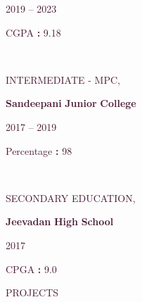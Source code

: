 \documentclass[12pt]{article}
\begin{document}
\begin{justify}
\textcolor[HTML]{481A34}{2019} \textcolor[HTML]{481A34}{ } \textcolor[HTML]{481A34}{–} \textcolor[HTML]{481A34}{ } \textcolor[HTML]{481A34}{2023}
\end{justify}
\begin{justify}
\textcolor[HTML]{481A34}{CGPA} \textcolor[HTML]{481A34}{ } \textcolor[HTML]{481A34}{\textbf{:}} \textcolor[HTML]{481A34}{\textbf{ }} \textcolor[HTML]{481A34}{9.18}
\end{justify}
\\
\begin{justify}
\textcolor[HTML]{481A34}{INTERMEDIATE - MPC,}
\end{justify}
\begin{flushleft}
\textcolor[HTML]{481A34}{\textbf{Sandeepani}} \textcolor[HTML]{481A34}{\textbf{ }} \textcolor[HTML]{481A34}{\textbf{Junior}} \textcolor[HTML]{481A34}{\textbf{ }} \textcolor[HTML]{481A34}{\textbf{College}}
\end{flushleft}
\begin{justify}
\textcolor[HTML]{481A34}{2017} \textcolor[HTML]{481A34}{ } \textcolor[HTML]{481A34}{–} \textcolor[HTML]{481A34}{ } \textcolor[HTML]{481A34}{2019}
\end{justify}
\begin{justify}
\textcolor[HTML]{481A34}{Percentage} \textcolor[HTML]{481A34}{ } \textcolor[HTML]{481A34}{\textbf{: }} \textcolor[HTML]{481A34}{98}
\end{justify}
\\
\begin{justify}
\textcolor[HTML]{481A34}{SECONDARY} \textcolor[HTML]{481A34}{ } \textcolor[HTML]{481A34}{EDUCATION,}
\end{justify}
\begin{flushleft}
\textcolor[HTML]{481A34}{\textbf{Jeevadan}} \textcolor[HTML]{481A34}{\textbf{ }} \textcolor[HTML]{481A34}{\textbf{High}} \textcolor[HTML]{481A34}{\textbf{ }} \textcolor[HTML]{481A34}{\textbf{School}}
\end{flushleft}
\begin{justify}
\textcolor[HTML]{481A34}{2017}
\end{justify}
\begin{justify}
\textcolor[HTML]{481A34}{CPGA} \textcolor[HTML]{481A34}{ } \textcolor[HTML]{481A34}{\textbf{:}} \textcolor[HTML]{481A34}{\textbf{ }} \textcolor[HTML]{481A34}{9.0}
\end{justify}
\begin{justify}

 \textcolor[HTML]{481A34}{PROJECTS}
\end{justify}
\end{document}
